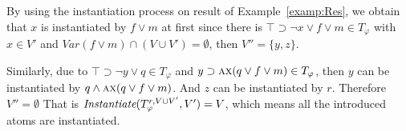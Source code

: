 \documentclass[runningheads]{llncs}
\newcommand{\Var}{\textit{Var}}
\newcommand{\start}{\textbf{start}}
\newcommand{\Sub}{\textrm{Sub}}
\newcommand{\ALL}{\textsc{a}}
\newcommand{\NEXT}{\textsc{x}}
\newcommand{\FUTURE}{\textsc{f}}
\newcommand{\UNTIL}{\textsc{u}}
\newcommand{\CTLsnf}{{\textsc{SNF}_{\textsc{ctl}}^g}}
\begin{document}
\begin{example}\label{exa:until:sub}
By using the instantiation process on result of Example~\ref{examp:Res}, we obtain that $x$ is instantiated by $f\vee m$ at first since there is $\top \supset \neg x \vee f \vee m \in T_{\varphi}$ with $x \in V'$ and $\Var(f \vee m) \cap (V\cup V') = \emptyset$, then $V''=\{y,z\}$.

Similarly, due to $\top \supset \neg y \vee q \in T_{\varphi}$ and $y \supset \ALL\NEXT(q \vee f\vee m)\in T_{\varphi}$, then $y$ can be instantiated by $q \wedge \ALL\NEXT(q \vee f\vee m)$. And $z$ can be instantiated by $r$. Therefore $V''=\emptyset$
That is $\emph{Instantiate}(T_{\varphi}^{r,V \cup V'}, V') = V$, which means all the introduced atoms are instantiated.
%
%

\end{example}
\end{document}
